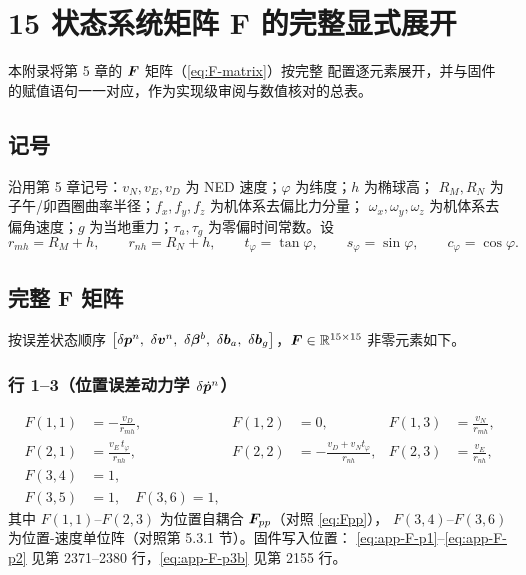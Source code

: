 \section{15 状态系统矩阵 F 的完整显式展开}
\label{app:F-matrix}

本附录将第 5 章的 $\boldsymbol{F}$ 矩阵（\cref{eq:F-matrix}）按完整
 配置逐元素展开，并与固件
 的赋值语句一一对应，作为实现级审阅与数值核对的总表。

\subsection{记号}

沿用第 5 章记号：$v_N, v_E, v_D$ 为 NED 速度；$\varphi$ 为纬度；$h$ 为椭球高；
$R_M, R_N$ 为子午/卯酉圈曲率半径；$f_x, f_y, f_z$ 为机体系去偏比力分量；
$\omega_x, \omega_y, \omega_z$ 为机体系去偏角速度；$g$ 为当地重力；$\tau_a,
\tau_g$ 为零偏时间常数。设
\begin{equation}
  r_{mh} = R_M + h, \qquad r_{nh} = R_N + h, \qquad
  t_\varphi = \tan\varphi, \qquad s_\varphi = \sin\varphi, \qquad
  c_\varphi = \cos\varphi.
  \label{eq:app-shorthand}
\end{equation}

\subsection{完整 F 矩阵}

按误差状态顺序 $\left[\delta\vp{p}^n,\ \delta\vp{v}^n,\ \delta\vp{\beta}^b,\
\delta\vp{b}_a,\ \delta\vp{b}_g\right]$，$\boldsymbol{F} \in \mathbb{R}^{15\times15}$
非零元素如下。

\subsubsection{行 1--3（位置误差动力学 $\delta\dot{\boldsymbol{p}}^n$）}

\begin{align}
  F(1,1) &= -\frac{v_D}{r_{mh}}, &
  F(1,2) &= 0, &
  F(1,3) &= \frac{v_N}{r_{mh}}, \label{eq:app-F-p1} \\
  F(2,1) &= \frac{v_E\,t_\varphi}{r_{nh}}, &
  F(2,2) &= -\frac{v_D + v_N t_\varphi}{r_{nh}}, &
  F(2,3) &= \frac{v_E}{r_{nh}}, \label{eq:app-F-p2} \\
  F(3,4) &= 1, \label{eq:app-F-p3} \\
  F(3,5) &= 1, \quad F(3,6) = 1, \label{eq:app-F-p3b}
\end{align}
其中 $F(1,1)$--$F(2,3)$ 为位置自耦合 $\boldsymbol{F}_{pp}$（对照 \cref{eq:Fpp}），
$F(3,4)$--$F(3,6)$ 为位置-速度单位阵（对照第 5.3.1 节）。固件写入位置：
\cref{eq:app-F-p1}--\cref{eq:app-F-p2} 见第 2371--2380 行，\cref{eq:app-F-p3b}
见第 2155 行。

